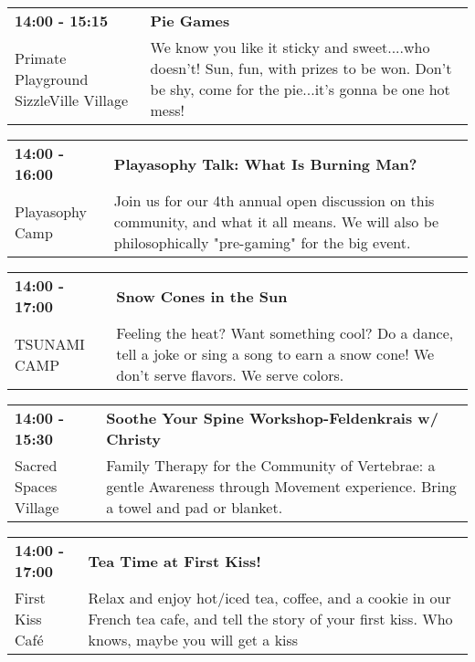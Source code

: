 \begin{tabular}{ p{1in} p{2.2in} }
    \textbf{14:00 - 15:15} & \textbf{Pie Games} \\
    Primate Playground \newline SizzleVille Village & We know you like it sticky and sweet....who doesn't! Sun, fun, with prizes to be won. Don't be shy, come for the pie...it's gonna be one hot mess! \\
    \hline 
\end{tabular}
    
\begin{tabular}{ p{1in} p{2.2in} }
    \textbf{14:00 - 16:00} & \textbf{Playasophy Talk: What Is Burning Man?} \\
    Playasophy Camp \newline  & Join us for our 4th annual open discussion on this community, and what it all means. We will also be philosophically "pre-gaming" for the big event. \\
    \hline 
\end{tabular}
    
\begin{tabular}{ p{1in} p{2.2in} }
    \textbf{14:00 - 17:00} & \textbf{Snow Cones in the Sun} \\
    TSUNAMI CAMP \newline  & Feeling the heat?  Want something cool?
Do a dance, tell a joke or sing a song to earn a snow cone!  We don't serve flavors. We serve colors. \\
    \hline 
\end{tabular}
    
\begin{tabular}{ p{1in} p{2.2in} }
    \textbf{14:00 - 15:30} & \textbf{Soothe Your Spine Workshop-Feldenkrais w/ Christy} \\
    Sacred Spaces Village \newline  & Family Therapy for the Community of Vertebrae: a gentle Awareness through Movement experience. Bring a towel and pad or blanket. \\
    \hline 
\end{tabular}
    
\begin{tabular}{ p{1in} p{2.2in} }
    \textbf{14:00 - 17:00} & \textbf{Tea Time at First Kiss!} \\
    First Kiss Caf\'e \newline  & Relax and enjoy hot/iced tea, coffee, and a cookie in our French tea cafe, and tell the story of your first kiss. Who knows, maybe you will get a kiss \\
    \hline 
\end{tabular}
    
